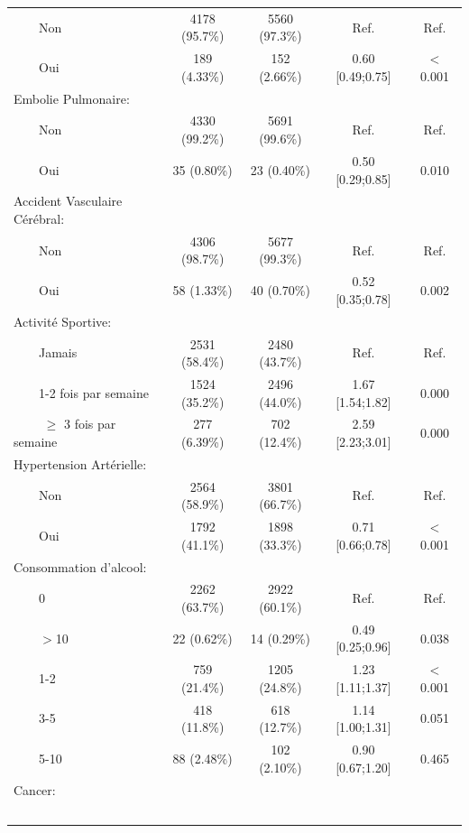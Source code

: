 \documentclass{book}
\begin{document}
\begin{longtable}{lcccc}
$\qquad$Non & 4178 (95.7\%) & 5560 (97.3\%) &       Ref.       &  Ref.  \\ 
$\qquad$Oui & 189 (4.33\%)  & 152 (2.66\%)  & 0.60 [0.49;0.75] & $<$0.001 \\ 
Embolie Pulmonaire: &              &              &                  &        \\ 
$\qquad$Non & 4330 (99.2\%) & 5691 (99.6\%) &       Ref.       &  Ref.  \\ 
$\qquad$Oui &  35 (0.80\%)  &  23 (0.40\%)  & 0.50 [0.29;0.85] &  0.010 \\ 
Accident Vasculaire Cérébral: &              &              &                  &        \\ 
$\qquad$Non & 4306 (98.7\%) & 5677 (99.3\%) &       Ref.       &  Ref.  \\ 
$\qquad$Oui &  58 (1.33\%)  &  40 (0.70\%)  & 0.52 [0.35;0.78] &  0.002 \\ 
Activité Sportive: &              &              &                  &        \\ 
$\qquad$Jamais & 2531 (58.4\%) & 2480 (43.7\%) &       Ref.       &  Ref.  \\ 
$\qquad$1-2 fois par semaine & 1524 (35.2\%) & 2496 (44.0\%) & 1.67 [1.54;1.82] &  0.000 \\ 
$\qquad$ $\geq$ 3 fois par semaine & 277 (6.39\%)  & 702 (12.4\%)  & 2.59 [2.23;3.01] &  0.000 \\ 
Hypertension Artérielle: &              &              &                  &        \\ 
$\qquad$Non & 2564 (58.9\%) & 3801 (66.7\%) &       Ref.       &  Ref.  \\ 
$\qquad$Oui & 1792 (41.1\%) & 1898 (33.3\%) & 0.71 [0.66;0.78] & $<$0.001 \\ 
Consommation d'alcool: &              &              &                  &        \\ 
$\qquad$0 & 2262 (63.7\%) & 2922 (60.1\%) &       Ref.       &  Ref.  \\ 
$\qquad$$>$10 &  22 (0.62\%)  &  14 (0.29\%)  & 0.49 [0.25;0.96] &  0.038 \\ 
$\qquad$1-2 & 759 (21.4\%)  & 1205 (24.8\%) & 1.23 [1.11;1.37] & $<$0.001 \\ 
$\qquad$3-5 & 418 (11.8\%)  & 618 (12.7\%)  & 1.14 [1.00;1.31] &  0.051 \\ 
$\qquad$5-10 &  88 (2.48\%)  & 102 (2.10\%)  & 0.90 [0.67;1.20] &  0.465 \\ 
Cancer: &              &              &                  &        \\ 
$$
\end{longtable}
\end{document}

